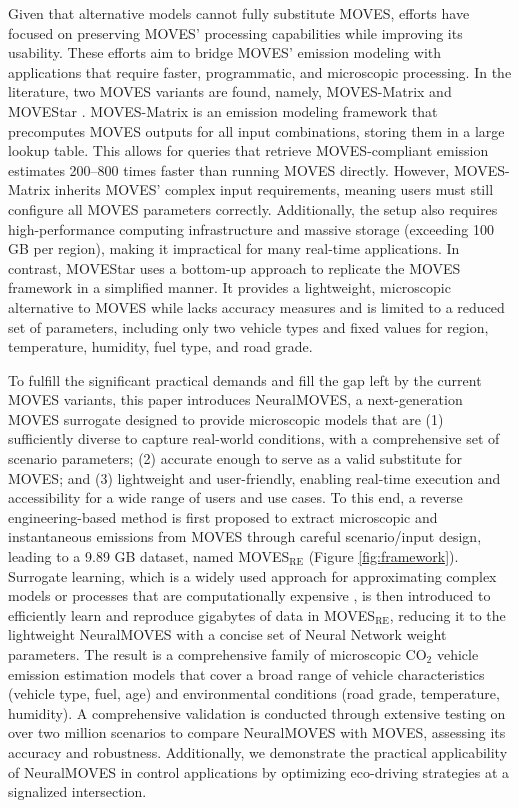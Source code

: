 \documentclass[12pt,english]{article}
\begin{document}
Given that alternative models cannot fully substitute MOVES, efforts have focused on preserving MOVES' processing capabilities while improving its usability. These efforts aim to bridge MOVES' emission modeling with applications that require faster, programmatic, and microscopic processing. In the literature, two MOVES variants are found, namely, MOVES-Matrix \citep{liu2016improved} and MOVEStar \citep{MOVESTAR}.
%
MOVES-Matrix is an emission modeling framework that precomputes MOVES outputs for all input combinations, storing them in a large lookup table. This allows for queries that retrieve MOVES-compliant emission estimates 200–800 times faster than running MOVES directly.
However, MOVES-Matrix inherits MOVES' complex input requirements, meaning users must still configure all MOVES parameters correctly. 
Additionally, the setup also requires high-performance computing infrastructure and massive storage (exceeding 100 GB per region), making it impractical for many real-time applications.
%
In contrast, MOVEStar uses a bottom-up approach to replicate the MOVES framework in a simplified manner. It provides a lightweight, microscopic alternative to MOVES while lacks accuracy measures and is limited to a reduced set of parameters, including only two vehicle types and fixed values for region, temperature, humidity, fuel type, and road grade. 



To fulfill the significant practical demands and fill the gap left by the current MOVES variants, this paper introduces NeuralMOVES, a next-generation MOVES surrogate designed to provide microscopic models that are (1) sufficiently diverse to capture real-world conditions, with a comprehensive set of scenario parameters; (2) accurate enough to serve as a valid substitute for MOVES; and (3) lightweight and user-friendly, enabling real-time execution and accessibility for a wide range of users and use cases.
To this end, a reverse engineering-based method is first proposed to extract microscopic and instantaneous emissions from MOVES through careful scenario/input design, leading to a 9.89 GB dataset, named MOVES$_\text{RE}$ (Figure \ref{fig:framework}).
Surrogate learning, which is a widely used approach for approximating complex models or processes that are computationally expensive \citep{tao2019application, han2017weighted,westermann2019surrogate,van2019surrogate,CARNEVALE201647,AIhealth}, is then introduced to efficiently learn and reproduce gigabytes of data in MOVES$_\text{RE}$, reducing it to the lightweight NeuralMOVES with a concise set of Neural Network weight parameters. 
The result is a comprehensive family of microscopic CO$_2$ vehicle emission estimation models that cover a broad range of vehicle characteristics (vehicle type, fuel, age) and environmental conditions (road grade, temperature, humidity).
A comprehensive validation is conducted through extensive testing on over two million scenarios to compare NeuralMOVES with MOVES, assessing its accuracy and robustness. 
Additionally, we demonstrate the practical applicability of NeuralMOVES in control applications by optimizing eco-driving strategies at a signalized intersection.
\end{document}

